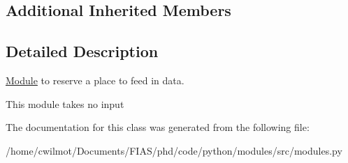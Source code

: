 \subsection*{Additional Inherited Members}


\subsection{Detailed Description}
\hyperlink{classmodules_1_1_module}{Module} to reserve a place to feed in data. 

This module takes no input 

The documentation for this class was generated from the following file\+:\begin{DoxyCompactItemize}
\item 
/home/cwilmot/\+Documents/\+F\+I\+A\+S/phd/code/python/modules/src/modules.\+py\end{DoxyCompactItemize}
